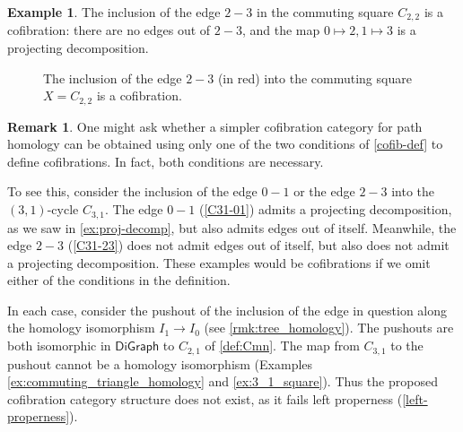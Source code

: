 \documentclass[11pt]{article}
\theoremstyle{definition}
\newtheorem{remark}[theo]{Remark}
\newtheorem{example}[theo]{Example}
\numberwithin{equation}{section}
\newcommand{\DiGraph}{\mathsf{DiGraph}}
\begin{document}
\begin{example}\label{ex:cofib}
The inclusion of the edge $2-3$ in the commuting square $C_{2,2}$ is a cofibration: there are no edges out of $2-3$, and the map $0 \mapsto 2, 1 \mapsto 3$ is a projecting decomposition.

    \begin{figure}[H]
        \centering
        \label{C22-23}
        \caption{The inclusion of the edge $2-3$ (in red) into the commuting square $X = C_{2,2}$ is a cofibration.}
    \end{figure} 


\end{example}

\begin{remark}\label{rmk:cofib-both-conditions}
One might ask whether a simpler cofibration category for path homology can be obtained using only one of the two conditions of \cref{cofib-def} to define cofibrations. In fact, both conditions are necessary.  

To see this, consider the inclusion of the edge $0-1$ or the edge $2-3$ into the $(3,1)$-cycle $C_{3,1}$. The edge $0-1$ (\cref{C31-01}) admits a projecting decomposition, as we saw in \cref{ex:proj-decomp}, but also admits edges out of itself. Meanwhile, the edge $2-3$ (\cref{C31-23}) does not admit edges out of itself, but also does not admit a projecting decomposition. These examples would be cofibrations if we omit either of the conditions in the definition. 

In each case, consider the pushout of the inclusion of the edge in question along the homology isomorphism $I_1 \to I_0$ (see \cref{rmk:tree_homology}).
The pushouts are both isomorphic in $\DiGraph$ to $C_{2,1}$ of \cref{def:Cmn}.
The map from $C_{3,1}$ to the pushout cannot be a homology isomorphism (Examples \ref{ex:commuting_triangle_homology} and \ref{ex:3_1_square}).
Thus the proposed cofibration category structure does not exist, as it fails left properness (\cref{left-properness}).
\end{remark}
\end{document}

